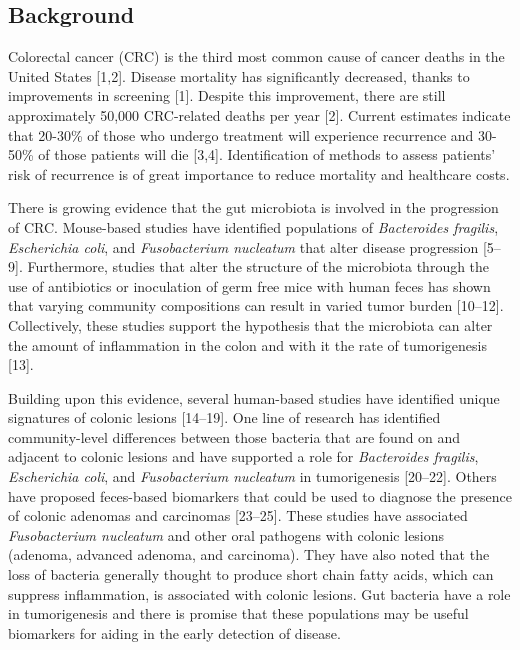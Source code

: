 \documentclass[12pt,]{article}
\begin{document}
\linenumbers

\subsection{Background}\label{background}

Colorectal cancer (CRC) is the third most common cause of cancer deaths
in the United States {[}1,2{]}. Disease mortality has significantly
decreased, thanks to improvements in screening {[}1{]}. Despite this
improvement, there are still approximately 50,000 CRC-related deaths per
year {[}2{]}. Current estimates indicate that 20-30\% of those who
undergo treatment will experience recurrence and 30-50\% of those
patients will die {[}3,4{]}. Identification of methods to assess
patients' risk of recurrence is of great importance to reduce mortality
and healthcare costs.

There is growing evidence that the gut microbiota is involved in the
progression of CRC. Mouse-based studies have identified populations of
\emph{Bacteroides fragilis}, \emph{Escherichia coli}, and
\emph{Fusobacterium nucleatum} that alter disease progression
{[}5--9{]}. Furthermore, studies that alter the structure of the
microbiota through the use of antibiotics or inoculation of germ free
mice with human feces has shown that varying community compositions can
result in varied tumor burden {[}10--12{]}. Collectively, these studies
support the hypothesis that the microbiota can alter the amount of
inflammation in the colon and with it the rate of tumorigenesis
{[}13{]}.

Building upon this evidence, several human-based studies have identified
unique signatures of colonic lesions {[}14--19{]}. One line of research
has identified community-level differences between those bacteria that
are found on and adjacent to colonic lesions and have supported a role
for \emph{Bacteroides fragilis}, \emph{Escherichia coli}, and
\emph{Fusobacterium nucleatum} in tumorigenesis {[}20--22{]}. Others
have proposed feces-based biomarkers that could be used to diagnose the
presence of colonic adenomas and carcinomas {[}23--25{]}. These studies
have associated \emph{Fusobacterium nucleatum} and other oral pathogens
with colonic lesions (adenoma, advanced adenoma, and carcinoma). They
have also noted that the loss of bacteria generally thought to produce
short chain fatty acids, which can suppress inflammation, is associated
with colonic lesions. Gut bacteria have a role in tumorigenesis and
there is promise that these populations may be useful biomarkers for
aiding in the early detection of disease.
\end{document}

